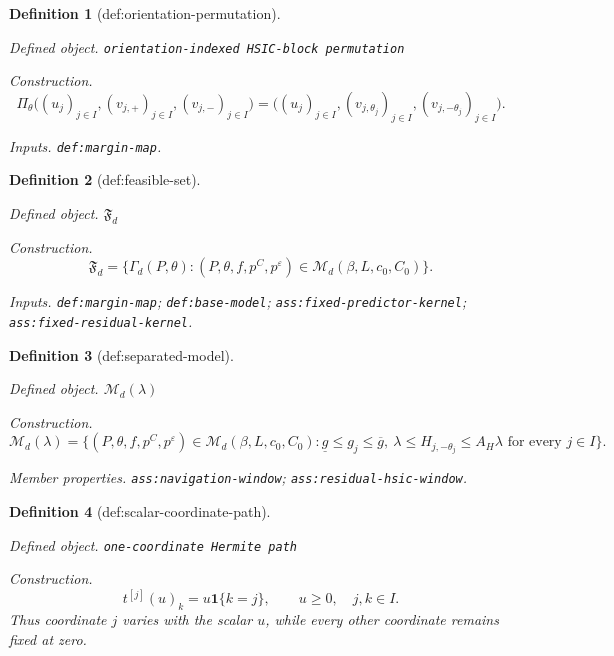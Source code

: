 \documentclass{article}
\newtheorem{definition}{Definition}
\begin{document}
\begin{definition}[def:orientation-permutation]\label{def:orientation-permutation}
\par\smallskip\noindent\emph{Defined object.} \texttt{orientation-\allowbreak{}indexed HSIC-\allowbreak{}block permutation}
\par\smallskip\noindent\emph{Construction.} \[\Pi_\theta\bigl((u_j)_{j\in I},(v_{j,+})_{j\in I},(v_{j,-})_{j\in I}\bigr)=\bigl((u_j)_{j\in I},(v_{j,\theta_j})_{j\in I},(v_{j,-\theta_j})_{j\in I}\bigr).\]
\par\smallskip\noindent\emph{Inputs.} \texttt{def:\allowbreak{}margin-\allowbreak{}map}.
\end{definition}

\begin{definition}[def:feasible-set]\label{def:feasible-set}
\par\smallskip\noindent\emph{Defined object.} \(\mathfrak F_d\)
\par\smallskip\noindent\emph{Construction.} \[\mathfrak F_d=\{\Gamma_d(P,\theta):(P,\theta,f,p^C,p^\varepsilon)\in\mathcal M_d(\beta,L,c_0,C_0)\}.\]
\par\smallskip\noindent\emph{Inputs.} \texttt{def:\allowbreak{}margin-\allowbreak{}map}; \texttt{def:\allowbreak{}base-\allowbreak{}model}; \texttt{ass:\allowbreak{}fixed-\allowbreak{}predictor-\allowbreak{}kernel}; \texttt{ass:\allowbreak{}fixed-\allowbreak{}residual-\allowbreak{}kernel}.
\end{definition}

\begin{definition}[def:separated-model]\label{def:separated-model}
\par\smallskip\noindent\emph{Defined object.} \(\mathcal M_d(\lambda)\)
\par\smallskip\noindent\emph{Construction.} \[\mathcal M_d(\lambda)=\{(P,\theta,f,p^C,p^\varepsilon)\in\mathcal M_d(\beta,L,c_0,C_0):\underline g\le g_j\le\overline g,\ \lambda\le H_{j,-\theta_j}\le A_H\lambda\text{ for every }j\in I\}.\]
\par\smallskip\noindent\emph{Member properties.} \texttt{ass:\allowbreak{}navigation-\allowbreak{}window}; \texttt{ass:\allowbreak{}residual-\allowbreak{}hsic-\allowbreak{}window}.
\end{definition}

\begin{definition}[def:scalar-coordinate-path]\label{def:scalar-coordinate-path}
\par\smallskip\noindent\emph{Defined object.} \texttt{one-\allowbreak{}coordinate Hermite path}
\par\smallskip\noindent\emph{Construction.} \[t^{[j]}(u)_k=u\mathbf 1\{k=j\},\qquad u\ge0,\quad j,k\in I.\] Thus coordinate \(j\) varies with the scalar \(u\), while every other coordinate remains fixed at zero.
\end{definition}
\end{document}
